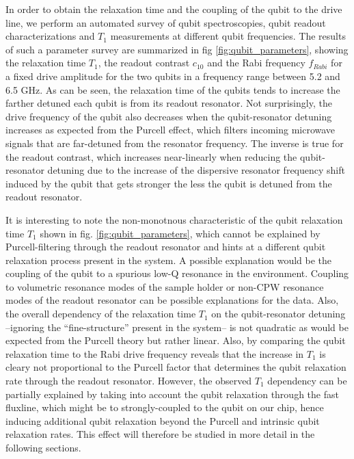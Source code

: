 In order to obtain the relaxation time and the coupling of the qubit to the drive line, we perform an automated survey of qubit spectroscopies, qubit readout characterizations and $T_1$ measurements at different qubit frequencies. The results of such a parameter survey are summarized in fig \ref{fig:qubit_parameters}, showing the relaxation time $T_1$,  the readout contrast $c_{10}$ and the Rabi frequency $f_{Rabi}$ for a fixed drive amplitude for the two qubits in a frequency range between 5.2 and 6.5 GHz. As can be seen, the relaxation time of the qubits tends to increase the farther detuned each qubit is from its readout resonator. Not surprisingly, the drive frequency of the qubit also decreases when the qubit-resonator detuning increases as expected from the Purcell effect, which filters incoming microwave signals that are far-detuned from the resonator frequency. The inverse is true for the readout contrast, which increases near-linearly when reducing the qubit-resonator detuning due to the increase of the dispersive resonator frequency shift induced by the qubit that gets stronger the less the qubit is detuned from the readout resonator.

\smallskip

It is interesting to note the non-monotnous characteristic of the qubit relaxation time $T_1$ shown in fig. \ref{fig:qubit_parameters}, which cannot be explained by Purcell-filtering through the readout resonator and hints at a different qubit relaxation process present in the system. A possible explanation would be the coupling of the qubit to a spurious low-Q resonance in the environment. Coupling to volumetric resonance modes of the sample holder or non-CPW resonance modes of the readout resonator can be possible explanations for the data. Also, the overall dependency of the relaxation time $T_1$ on the qubit-resonator detuning --ignoring the ``fine-structure'' present in the system-- is not quadratic as would be expected from the Purcell theory but rather linear. Also, by comparing the qubit relaxation time to the Rabi drive frequency reveals that the increase in $T_1$ is cleary not proportional to the Purcell factor that determines the qubit relaxation rate through the readout resonator. However, the observed $T_1$ dependency can be partially explained by taking into account the qubit relaxation through the fast fluxline, which might be to strongly-coupled to the qubit on our chip, hence inducing additional qubit relaxation beyond the Purcell and intrinsic qubit relaxation rates. This effect will therefore be studied in more detail in the following sections.

